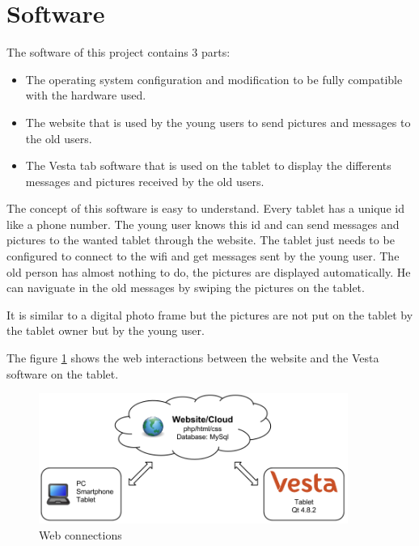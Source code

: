 

\section{Software}
The software of this project contains 3 parts:
\begin{itemize}
\item{The operating system configuration and modification to be fully compatible with the hardware used.}
\item{The website that is used by the young users to send pictures and messages to the old users.}
\item{The Vesta tab software that is used on the tablet to display the differents messages and pictures received by the old users.}
\end{itemize}

The concept of this software is easy to understand. Every tablet has a unique id like a phone number. The young user knows this id and can send messages and pictures to the wanted tablet through the website. The tablet just needs to be configured to connect to the wifi and get messages sent by the young user. The old person has almost nothing to do, the pictures are displayed automatically. He can naviguate in the old messages by swiping the pictures on the tablet.

It is similar to a digital photo frame but the pictures are not put on the tablet by the tablet owner but by the young user.

The figure \ref{fig:web connections} shows the web interactions between the website and the Vesta software on the tablet.

\begin{figure}[!htb]
    \centering
    \includegraphics[width=0.9\textwidth,keepaspectratio]{chap/softFig/web_connections.png}
    \caption{Web connections}
    \label{fig:web connections}
\end{figure}

